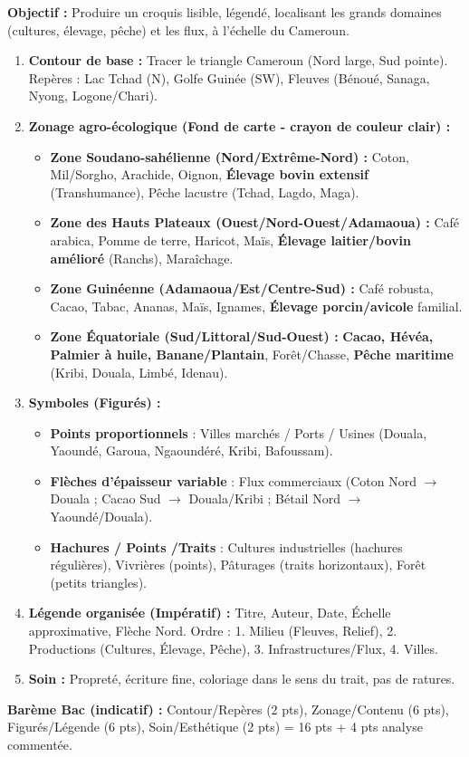 \documentclass[11pt]{article}
\begin{document}
\begin{methode}
\textbf{Objectif :} Produire un croquis lisible, légendé, localisant les grands domaines (cultures, élevage, pêche) et les flux, à l'échelle du Cameroun.
\begin{enumerate}
    \item \textbf{Contour de base :} Tracer le triangle Cameroun (Nord large, Sud pointe). Repères : Lac Tchad (N), Golfe Guinée (SW), Fleuves (Bénoué, Sanaga, Nyong, Logone/Chari).
    \item \textbf{Zonage agro-écologique (Fond de carte - crayon de couleur clair) :}
    \begin{itemize}
        \item \textbf{Zone Soudano-sahélienne (Nord/Extrême-Nord) :} Coton, Mil/Sorgho, Arachide, Oignon, \textbf{Élevage bovin extensif} (Transhumance), Pêche lacustre (Tchad, Lagdo, Maga).
        \item \textbf{Zone des Hauts Plateaux (Ouest/Nord-Ouest/Adamaoua) :} Café arabica, Pomme de terre, Haricot, Maïs, \textbf{Élevage laitier/bovin amélioré} (Ranchs), Maraîchage.
        \item \textbf{Zone Guinéenne (Adamaoua/Est/Centre-Sud) :} Café robusta, Cacao, Tabac, Ananas, Maïs, Ignames, \textbf{Élevage porcin/avicole} familial.
        \item \textbf{Zone Équatoriale (Sud/Littoral/Sud-Ouest) :} \textbf{Cacao, Hévéa, Palmier à huile, Banane/Plantain}, Forêt/Chasse, \textbf{Pêche maritime} (Kribi, Douala, Limbé, Idenau).
    \end{itemize}
    \item \textbf{Symboles (Figurés) :}
    \begin{itemize}
        \item \textbf{Points proportionnels} : Villes marchés / Ports / Usines (Douala, Yaoundé, Garoua, Ngaoundéré, Kribi, Bafoussam).
        \item \textbf{Flèches d'épaisseur variable} : Flux commerciaux (Coton Nord $\to$ Douala ; Cacao Sud $\to$ Douala/Kribi ; Bétail Nord $\to$ Yaoundé/Douala).
        \item \textbf{Hachures / Points /Traits} : Cultures industrielles (hachures régulières), Vivrières (points), Pâturages (traits horizontaux), Forêt (petits triangles).
    \end{itemize}
    \item \textbf{Légende organisée (Impératif) :} Titre, Auteur, Date, Échelle approximative, Flèche Nord. Ordre : 1. Milieu (Fleuves, Relief), 2. Productions (Cultures, Élevage, Pêche), 3. Infrastructures/Flux, 4. Villes.
    \item \textbf{Soin :} Propreté, écriture fine, coloriage dans le sens du trait, pas de ratures.
\end{enumerate}
\textbf{Barème Bac (indicatif) :} Contour/Repères (2 pts), Zonage/Contenu (6 pts), Figurés/Légende (6 pts), Soin/Esthétique (2 pts) = 16 pts + 4 pts analyse commentée.
\end{methode}
\end{document}
